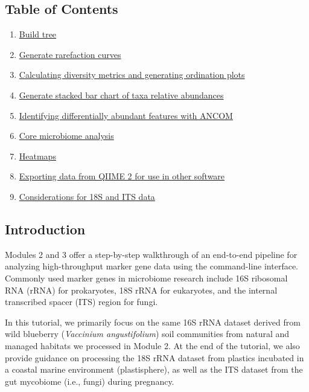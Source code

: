 \documentclass[
]{book}
\providecommand{\tightlist}{%
  \setlength{\itemsep}{0pt}\setlength{\parskip}{0pt}}
\begin{document}
\subsection{Table of Contents}\label{table-of-contents}

\begin{enumerate}
\def\labelenumi{\arabic{enumi}.}
\tightlist
\item
  \hyperref[build-tree]{Build tree}\\
\item
  \hyperref[rarefaction-curves]{Generate rarefaction curves}\\
\item
  \hyperref[diversity-ordination]{Calculating diversity metrics and generating ordination plots}\\
\item
  \hyperref[stacked-bar-chart]{Generate stacked bar chart of taxa relative abundances}\\
\item
  \hyperref[ancom]{Identifying differentially abundant features with ANCOM}\\
\item
  \hyperref[core-microbiome]{Core microbiome analysis}\\
\item
  \hyperref[heatmaps]{Heatmaps}\\
\item
  \hyperref[exporting-data]{Exporting data from QIIME 2 for use in other software}\\
\item
  \hyperref[18s-its]{Considerations for 18S and ITS data}
\end{enumerate}

\subsection{Introduction}\label{introduction-2}

Modules 2 and 3 offer a step-by-step walkthrough of an end-to-end pipeline for analyzing high-throughput marker gene data using the command-line interface. Commonly used marker genes in microbiome research include 16S ribosomal RNA (rRNA) for prokaryotes, 18S rRNA for eukaryotes, and the internal transcribed spacer (ITS) region for fungi.

In this tutorial, we primarily focus on the same 16S rRNA dataset derived from wild blueberry (\emph{Vaccinium angustifolium}) soil communities from natural and managed habitats we processed in Module 2. At the end of the tutorial, we also provide guidance on processing the 18S rRNA dataset from plastics incubated in a coastal marine environment (plastisphere), as well as the ITS dataset from the gut mycobiome (i.e., fungi) during pregnancy.
\end{document}
